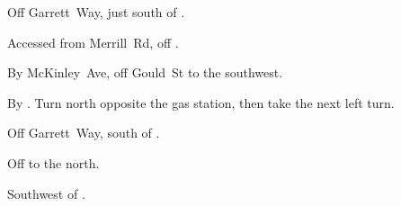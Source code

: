 
\begin{LocationList}

Off  Garrett~Way, just south of  .

Accessed from Merrill~Rd, off  .

By McKinley~Ave, off  Gould~St to the southwest.

By  .
Turn north opposite the gas station, then take the next left turn.

Off  Garrett~Way, south of  .

Off   to the north.

\Location{\TruckStop \Gas \Rest \Weigh}
Southwest of  .

\end{LocationList}
